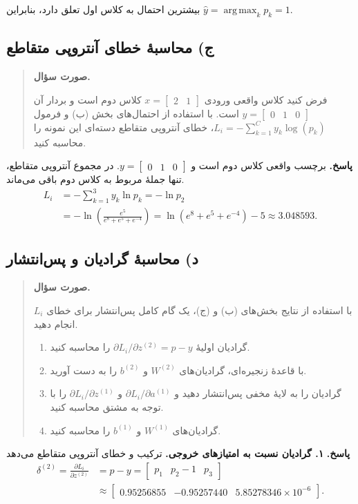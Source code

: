 \documentclass{article}
\numberwithin{equation}{section}
\numberwithin{table}{section}
\DeclareMathOperator*{\argmax}{arg\,max}
\newenvironment{questionprompt}{%
    \begin{quote}\noindent\textbf{صورت سؤال.}\enspace\ignorespaces
}{%
    \end{quote}\noindent\textbf{پاسخ.}\enspace\ignorespacesafterend
}
\begin{document}
بیشترین احتمال به کلاس اول تعلق دارد، بنابراین \(\hat{y}=\argmax_k p_k=1\).

\subsection*{ج) محاسبهٔ خطای آنتروپی متقاطع}
\begin{questionprompt}
    فرض کنید کلاس واقعی ورودی \(x=\begin{bmatrix}2&1\end{bmatrix}\) کلاس دوم است و بردار  آن \(y=\begin{bmatrix}0&1&0\end{bmatrix}\) است. با استفاده از احتمال‌های بخش (ب) و فرمول \(L_i=-\sum_{k=1}^{C} y_k\log(p_k)\)، خطای آنتروپی متقاطع دسته‌ای این نمونه را محاسبه کنید.
\end{questionprompt}
برچسب واقعی کلاس دوم است و \(y=\begin{bmatrix}0&1&0\end{bmatrix}\).
در مجموع آنتروپی متقاطع، تنها جملهٔ مربوط به کلاس دوم باقی می‌ماند.
\begin{align*}
    L_i
    &=-\sum_{k=1}^{3}y_k\ln p_k=-\ln p_2\\
    &=-\ln\!\left(\frac{e^5}{e^8+e^5+e^{-4}}\right)
     =\ln(e^8+e^5+e^{-4})-5\approx3.048593.
\end{align*}

\subsection*{د) محاسبهٔ گرادیان و پس‌انتشار}
\begin{questionprompt}
    با استفاده از نتایج بخش‌های (ب) و (ج)، یک گام کامل پس‌انتشار برای خطای \(L_i\) انجام دهید.
    \begin{enumerate}
        \item گرادیان اولیهٔ \(\partial L_i/\partial z^{(2)}=p-y\) را محاسبه کنید.
        \item با قاعدهٔ زنجیره‌ای، گرادیان‌های \(W^{(2)}\) و \(b^{(2)}\) را به دست آورید.
        \item گرادیان را به لایهٔ مخفی پس‌انتشار دهید و \(\partial L_i/\partial a^{(1)}\) و \(\partial L_i/\partial z^{(1)}\) را با توجه به مشتق  محاسبه کنید.
        \item گرادیان‌های \(W^{(1)}\) و \(b^{(1)}\) را محاسبه کنید.
    \end{enumerate}
\end{questionprompt}
\textbf{۱. گرادیان نسبت به امتیازهای خروجی.}
ترکیب  و خطای آنتروپی متقاطع می‌دهد
\begin{align*}
    \delta^{(2)}=\frac{\partial L_i}{\partial z^{(2)}}
    &=p-y=\begin{bmatrix}p_1 & p_2-1 & p_3\end{bmatrix}\\
    &\approx\begin{bmatrix}0.95256855&-0.95257440&5.85278346\times10^{-6}\end{bmatrix}.
\end{align*}
\end{document}
